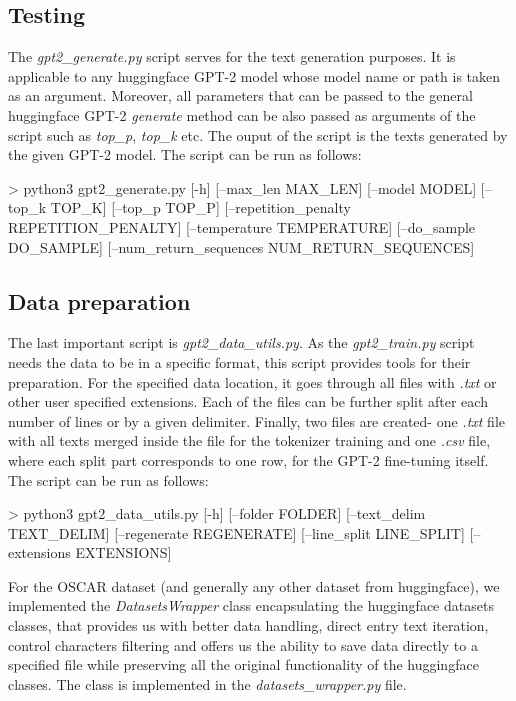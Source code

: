 \subsection*{Testing}
The \textit{gpt2\_generate.py} script serves for the text generation purposes. It is applicable to any huggingface GPT-2 model whose model name or path is taken as an argument. Moreover, all parameters that can be passed to the general huggingface GPT-2 \textit{generate} method can be also passed as arguments of the script such as \textit{top\_p}, \textit{top\_k} etc. The ouput of the script is the texts generated by the given GPT-2 model. The script can be run as follows:
\begin{code}
> python3 gpt2_generate.py [-h] [--max_len MAX_LEN] 
                          [--model MODEL] 
                          [--top_k TOP_K] 
                          [--top_p TOP_P] 
                          [--repetition_penalty REPETITION_PENALTY] 
                          [--temperature TEMPERATURE] 
                          [--do_sample DO_SAMPLE]
                          [--num_return_sequences NUM_RETURN_SEQUENCES]
\end{code}

\subsection*{Data preparation}
The last important script is \textit{gpt2\_data\_utils.py}. As the \textit{gpt2\_train.py} script needs the data to be in a specific format, this script provides tools for their preparation. For the specified data location, it goes through all files with \textit{.txt} or other user specified extensions. Each of the files can be further split after each number of lines or by a given delimiter. Finally, two files are created- one \textit{.txt} file with all texts merged inside the file for the tokenizer training and one \textit{.csv} file, where each split part corresponds to one row, for the GPT-2 fine-tuning itself. The script can be run as follows:\\
\begin{code}
> python3 gpt2_data_utils.py [-h] [--folder FOLDER] 
                             [--text_delim TEXT_DELIM] 
                             [--regenerate REGENERATE] 
                             [--line_split LINE_SPLIT] 
                             [--extensions EXTENSIONS]
\end{code}

For the OSCAR dataset (and generally any other dataset from huggingface), we implemented the \textit{DatasetsWrapper} class encapsulating the huggingface datasets classes, that provides us with better data handling, direct entry text iteration, control characters filtering and offers us the ability to save data directly to a specified file while preserving all the original functionality of the huggingface classes. The class is implemented in the \textit{datasets\_wrapper.py} file.

